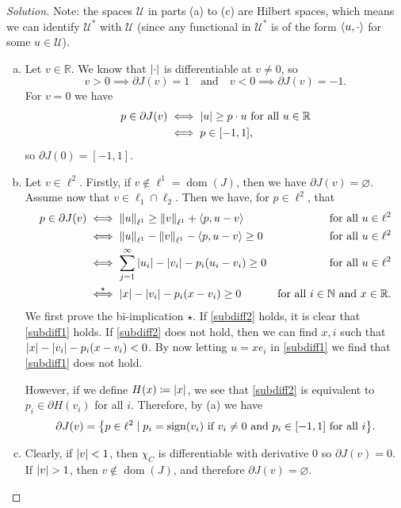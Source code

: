 \documentclass{article}
\theoremstyle{plain}
\theoremstyle{remark}
\newenvironment{solution}{\begin{proof}[Solution]\renewcommand\qedsymbol{}}{\end{proof}}
\renewcommand{\emptyset}{\varnothing}
\newcommand{\Bb}{\mathbb}
\newcommand{\Cal}{\mathcal}
\newcommand{\NN}{\Bb N}
\newcommand{\RR}{\Bb R}
\newcommand\UU{\Cal U}
\DeclarePairedDelimiter{\ang}{\langle}{\rangle}
\newcommand\ceq\coloneqq %
\DeclareMathOperator{\sign}{sign}
\newcommand\pt\partial
\DeclareMathOperator\dom{dom}
\begin{document}
\begin{solution}
	Note: the spaces $\UU$ in parts (a) to (c) are Hilbert spaces, which means we can identify $\UU^*$ with $\UU$ (since any functional in $\UU^*$ is of the form $\ang{u, \cdot}$ for some $u \in \UU$). 
\begin{enumerate}[(a)]
\item Let $v \in \RR$. We know that $\abs{\cdot}$ is differentiable at $v \neq 0$, so 
\[
v > 0 \implies \pt J(v) = \qty{1} \quad\text{and}\quad v < 0 \implies \pt J(v) = \qty{-1}. 
\]
For $v = 0$ we have
\begin{align*}
	p \in \pt J(v) &\iff \abs{u} \geq p \cdot u  \text{ for all $u \in \RR$} \\
	&\iff p \in [-1, 1],
\end{align*}
so $\pt J(0) = [-1, 1]$. 

\item Let $v \in \ell^2$. Firstly, if $v \notin \ell^1 = \dom(J)$, then we have $\pt J(v) = \emptyset$. Assume now that $v \in \ell_1 \cap \ell_2$. Then we have, for $p \in \ell^2$, that
\begin{align}
	p \in \pt J(v) &\iff \norm{u}_{\ell^1} \geq \norm{v}_{\ell^1} + \ang{p, u - v} &\text{for all $u \in \ell^2$}  \nonumber \\
	&\iff \norm{u}_{\ell^1} - \norm{v}_{\ell^1} - \ang{p, u- v} \geq 0 &\text{for all $u \in \ell^2$} \nonumber \\
	&\iff \sum_{j=1}^\infty \abs{u_i} - \abs{v_i} - p_i(u_i - v_i) \geq 0 &\text{for all $u \in \ell^2$} \label{subdiff1} \\
	&\overset\star\iff \abs{x} - \abs{v_i} - p_i(x - v_i) \geq 0 &\text{for all $i \in \NN$ and $x \in \RR$}. \label{subdiff2}  
\end{align}
We first prove the bi-implication $\star$. If \eqref{subdiff2} holds, it is clear that \eqref{subdiff1} holds. If \eqref{subdiff2} does not hold, then we can find $x, i$ such that $\abs{x} - \abs{v_i} - p_i(x - v_i) < 0$. By now letting $u = x e_i$ in \eqref{subdiff1} we find  that \eqref{subdiff1} does not hold. 

However, if we define $H(x) \ceq \abs{x}$,  we see that \cref{subdiff2} is equivalent to $p_i \in \pt H(v_i)$ for all $i$. Therefore, by (a) we have
\[
\pt J(v) = \qty{p \in \ell^2 \mid p_i = \sign(v_i) \text{ if $v_i \neq 0$ and } p_i \in [-1, 1] \text{ for all $i$}}. 
\]

\item Clearly, if $\abs{v} < 1$, then $\chi_C$ is differentiable with derivative 0 so $\pt J(v) = \qty{0}$. If $\abs{v} > 1$, then $v \notin \dom(J)$, and therefore $\pt J(v) = \emptyset$. 


\end{enumerate}
\end{solution}
\end{document}
